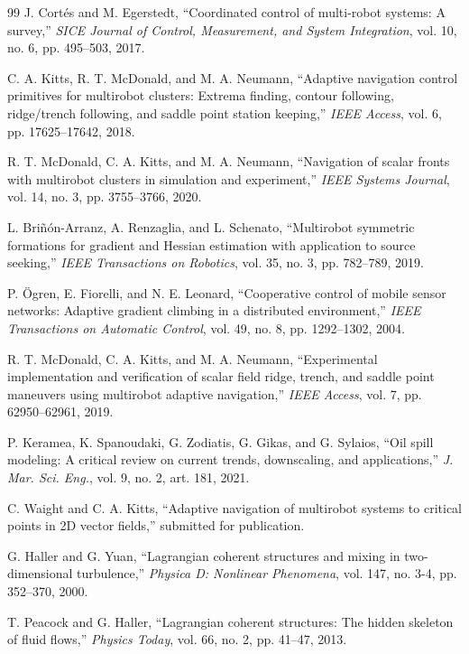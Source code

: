 \documentclass[lettersize,journal]{IEEEtran}
\begin{document}
\begin{thebibliography}{99}
 J. Cortés and M. Egerstedt, ``Coordinated control of multi-robot
systems: A survey,'' \textit{SICE Journal of Control, Measurement, and
System Integration}, vol. 10, no. 6, pp. 495--503, 2017.

 C. A. Kitts, R. T. McDonald, and M. A. Neumann, ``Adaptive
navigation control primitives for multirobot clusters: Extrema finding,
contour following, ridge/trench following, and saddle point station keeping,''
\textit{IEEE Access}, vol. 6, pp. 17625--17642, 2018.

 R. T. McDonald, C. A. Kitts, and M. A. Neumann, ``Navigation of
scalar fronts with multirobot clusters in simulation and experiment,''
\textit{IEEE Systems Journal}, vol. 14, no. 3, pp. 3755--3766, 2020.

 L. Briñón-Arranz, A. Renzaglia, and L. Schenato, ``Multirobot
symmetric formations for gradient and Hessian estimation with application to
source seeking,'' \textit{IEEE Transactions on Robotics}, vol. 35, no. 3,
pp. 782--789, 2019.

 P. Ögren, E. Fiorelli, and N. E. Leonard, ``Cooperative control
of mobile sensor networks: Adaptive gradient climbing in a distributed
environment,'' \textit{IEEE Transactions on Automatic Control}, vol. 49, no. 8,
pp. 1292--1302, 2004.

 R. T. McDonald, C. A. Kitts, and M. A. Neumann, ``Experimental
implementation and verification of scalar field ridge, trench, and saddle
point maneuvers using multirobot adaptive navigation,'' \textit{IEEE Access},
vol. 7, pp. 62950--62961, 2019.

 P. Keramea, K. Spanoudaki, G. Zodiatis, G. Gikas, and
G. Sylaios, ``Oil spill modeling: A critical review on current trends,
downscaling, and applications,'' \textit{J. Mar. Sci. Eng.}, vol. 9,
no. 2, art. 181, 2021.

 C. Waight and C. A. Kitts, ``Adaptive navigation of multirobot
systems to critical points in 2D vector fields,'' submitted for publication.

 G. Haller and G. Yuan, ``Lagrangian coherent structures and mixing
in two-dimensional turbulence,'' \textit{Physica D: Nonlinear Phenomena},
vol. 147, no. 3-4, pp. 352--370, 2000.

 T. Peacock and G. Haller, ``Lagrangian coherent structures: The
hidden skeleton of fluid flows,'' \textit{Physics Today}, vol. 66, no. 2,
pp. 41--47, 2013.


\end{thebibliography}
\end{document}

